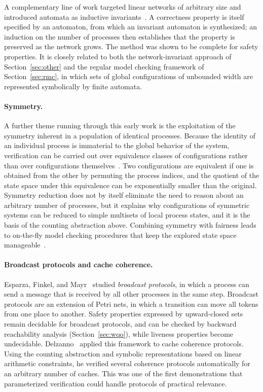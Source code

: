 A complementary line of work targeted linear networks of arbitrary size and
introduced automata as inductive invariants~\cite{SisGyu99}. A correctness
property is itself specified by an automaton, from which an invariant
automaton is synthesized; an induction on the number of processes then
establishes that the property is preserved as the network grows. The method
was shown to be complete for safety properties. It is closely related to both
the network-invariant approach of Section~\ref{sec:other} and the regular
model checking framework of Section~\ref{sec:rmc}, in which sets of global
configurations of unbounded width are represented symbolically by finite
automata.

\paragraph{Symmetry.}
A further theme running through this early work is the exploitation of the
symmetry inherent in a population of identical processes. Because the identity
of an individual process is immaterial to the global behavior of the system,
verification can be carried out over equivalence classes of configurations
rather than over configurations themselves~\cite{EmeSis96,CEFJ96,ID96}. Two
configurations are equivalent if one is obtained from the other by permuting
the process indices, and the quotient of the state space under this
equivalence can be exponentially smaller than the original. Symmetry
reduction does not by itself eliminate the need to reason about an arbitrary number of processes, but it explains why configurations of symmetric
systems can be reduced to simple multisets of local process states, and it is the basis of the counting
abstraction above. Combining symmetry with fairness leads to on-the-fly model
checking procedures that keep the explored state space
manageable~\cite{GyuSis97}.

\paragraph{Broadcast protocols and cache coherence.}
Esparza, Finkel, and Mayr~\cite{EFM99} studied \emph{broadcast protocols}, in
which a process can send a message that is received by all other processes in
the same step. Broadcast protocols are an extension of Petri nets, in which a
transition can move all tokens from one place to another. Safety properties
expressed by upward-closed sets remain decidable for broadcast protocols, and
can be checked by backward reachability analysis (Section~\ref{sec:wqo}), while
liveness properties become undecidable. Delzanno~\cite{Del00} applied this
framework to cache coherence protocols. Using the counting abstraction and
symbolic representations based on linear arithmetic constraints, he verified
several coherence protocols automatically for an arbitrary number of caches.
This was one of the first demonstrations that parameterized verification could
handle protocols of practical relevance.

